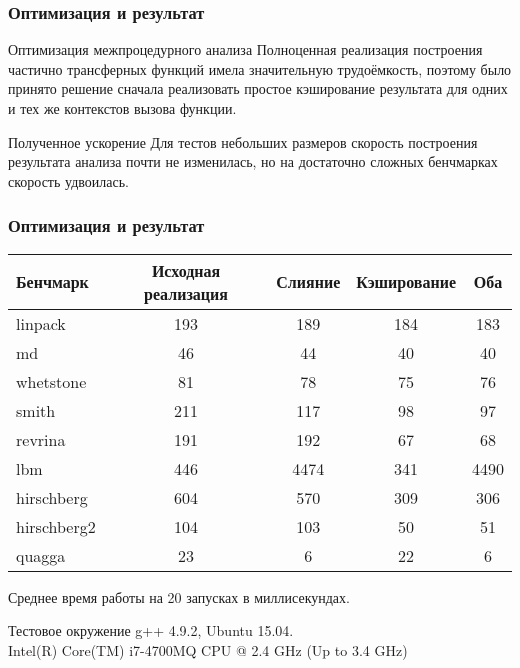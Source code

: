 \documentclass[utf8,russian]{beamer}
\begin{document}
\begin{frame}
\frametitle{Оптимизация и результат}

\begin{block}{Оптимизация межпроцедурного анализа}
Полноценная реализация построения частично трансферных функций имела значительную трудоёмкость, поэтому было принято решение сначала реализовать простое кэширование результата для одних и тех же контекстов вызова функции.
\end{block}

\begin{block}{Полученное ускорение}
Для тестов небольших размеров скорость построения результата анализа почти не изменилась, но на достаточно сложных бенчмарках скорость удвоилась.
\end{block}

\end{frame}


\begin{frame}
\frametitle{Оптимизация и результат}

\begin{block}{}

\begin{table}
\begin{tabular}{l | c | c | c | c }
Бенчмарк & Исходная реализация & Слияние & Кэширование & Оба \\
\hline \hline
linpack & 193 & 189 & 184 & 183 \\
md & 46 & 44 & 40 & 40\\ 
whetstone & 81 & 78 & 75 & 76\\
smith & 211 & 117 & 98 & 97\\
revrina & 191 & 192 & 67 & 68\\
lbm & 446 & 4474 & 341 & 4490\\
hirschberg & 604 & 570 & 309 & 306\\
hirschberg2 & 104 & 103 & 50 & 51\\
quagga & 23 & 6 & 22 & 6
\end{tabular}
\end{table}
Среднее время работы на 20 запусках в миллисекундах.
\end{block}

\begin{block}{Тестовое окружение}
g++ 4.9.2, Ubuntu 15.04.\\
Intel(R) Core(TM) i7-4700MQ CPU @ 2.4 GHz (Up to 3.4 GHz)
\end{block}

\end{frame}

\end{document}

